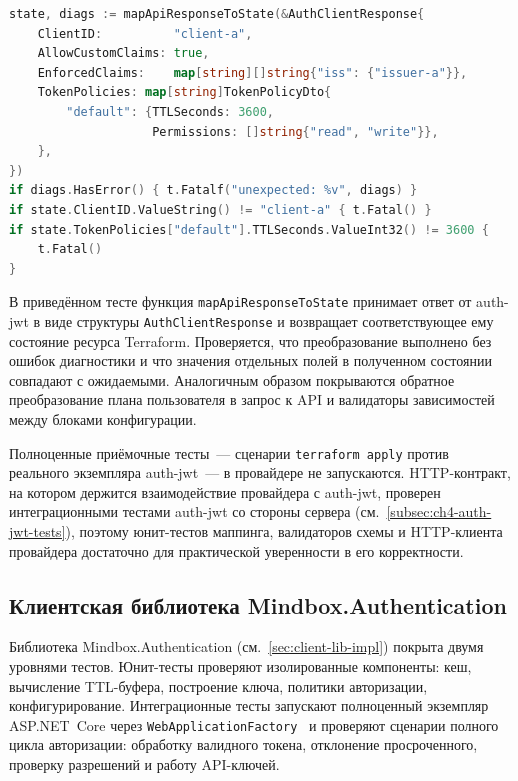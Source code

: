 \begin{codeblock}
\begin{lstlisting}[language=Go]
state, diags := mapApiResponseToState(&AuthClientResponse{
    ClientID:          "client-a",
    AllowCustomClaims: true,
    EnforcedClaims:    map[string][]string{"iss": {"issuer-a"}},
    TokenPolicies: map[string]TokenPolicyDto{
        "default": {TTLSeconds: 3600,
                    Permissions: []string{"read", "write"}},
    },
})
if diags.HasError() { t.Fatalf("unexpected: %v", diags) }
if state.ClientID.ValueString() != "client-a" { t.Fatal() }
if state.TokenPolicies["default"].TTLSeconds.ValueInt32() != 3600 {
    t.Fatal()
}
\end{lstlisting}
\end{codeblock}

В приведённом тесте функция \texttt{mapApiResponseToState}
принимает ответ от auth-jwt в виде структуры \texttt{AuthClientResponse}
и возвращает соответствующее ему состояние ресурса Terraform.
Проверяется, что преобразование выполнено без ошибок диагностики
и что значения отдельных полей в полученном состоянии совпадают
с ожидаемыми. Аналогичным образом покрываются обратное преобразование
плана пользователя в запрос к API и валидаторы зависимостей
между блоками конфигурации.

Полноценные приёмочные тесты~--- сценарии \texttt{terraform~apply}
против реального экземпляра auth-jwt~--- в провайдере не запускаются.
HTTP-контракт, на котором держится взаимодействие провайдера
с auth-jwt, проверен интеграционными тестами auth-jwt
со стороны сервера (см.~\ref{subsec:ch4-auth-jwt-tests}),
поэтому юнит-тестов маппинга, валидаторов схемы
и HTTP-клиента провайдера достаточно для практической уверенности
в его корректности.

\subsection{Клиентская библиотека Mindbox.Authentication}\label{subsec:ch4-lib-tests}

Библиотека Mindbox.Authentication (см.~\ref{sec:client-lib-impl})
покрыта двумя уровнями тестов.
Юнит-тесты проверяют изолированные компоненты:
кеш, вычисление TTL-буфера, построение ключа,
политики авторизации, конфигурирование.
Интеграционные тесты запускают полноценный экземпляр ASP.NET~Core
через \texttt{WebApplicationFactory}~\cite{TestWebApplicationFactory}
и проверяют сценарии полного цикла авторизации:
обработку валидного токена, отклонение просроченного,
проверку разрешений и работу API-ключей.

